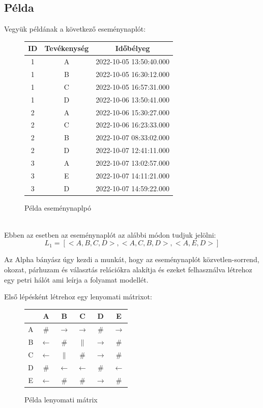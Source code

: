 \newpage

\subsection{Példa}
Vegyük példának a következő eseménynaplót:\\
\begin{figure}[h]
\begin{center}
\caption{Példa eseménynaplpó}
\begin{tabular}{||c | c | c ||}
	\hline
	ID & Tevékenység & Időbélyeg \\ [0.5ex]
	\hline\hline
	1 & A & 2022-10-05 13:50:40.000 \\
	\hline
	1 & B & 2022-10-05 16:30:12.000 \\
	\hline
	1 & C & 2022-10-05 16:57:31.000 \\
	\hline
	1 & D & 2022-10-06 13:50:41.000 \\
	\hline
	2 & A & 2022-10-06 15:30:27.000 \\
	\hline
	2 & C & 2022-10-06 16:23:33.000 \\
	\hline
	2 & B & 2022-10-07 08:33:02.000 \\
	\hline
	2 & D & 2022-10-07 12:41:11.000 \\
	\hline
	3 & A & 2022-10-07 13:02:57.000 \\
	\hline
	3 & E & 2022-10-07 14:11:21.000 \\
	\hline
	3 & D & 2022-10-07 14:59:22.000 \\
	\hline
\end{tabular}
\label{fig:example}
\end{center}
\end{figure}\\	
Ebben az esetben az eseménynaplót az alábbi módon tudjuk jelölni:
\[ 
	L_1 = [< A,B,C,D >, <A,C,B,D>, <A,E,D>]
\]

Az Alpha bányász úgy kezdi a munkát, hogy az eseménynaplót közvetlen-sorrend, okozat, párhuzam és választás relációkra alakítja és ezeket felhasználva létrehoz egy petri hálót ami leírja a folyamat modellét.

Első lépésként létrehoz egy lenyomati mátrixot:

\begin{figure}[h!]
\begin{center}
\caption{Példa lenyomati mátrix}
\begin{tabular}{|c | c | c | c | c | c|}
	\hline
	\hspace{0.1cm} & A & B & C & D & E \\
	\hline
	A & \# & $\rightarrow$ & $\rightarrow$ & \# & $\rightarrow$ \\
	\hline
	B & $\leftarrow$ & \# & $\parallel$ & $\rightarrow$ & \# \\
	\hline
	C & $\leftarrow$ & $\parallel$ & \# & $\rightarrow$ & \# \\
	\hline
	D  & \# & $\leftarrow$ & $\leftarrow$ & \# & $\leftarrow$ \\
	\hline
	E & $\leftarrow$ & \# & \# & $\rightarrow$ & \# \\
	\hline
\end{tabular}
\label{fig:example}
\end{center}
\end{figure}

